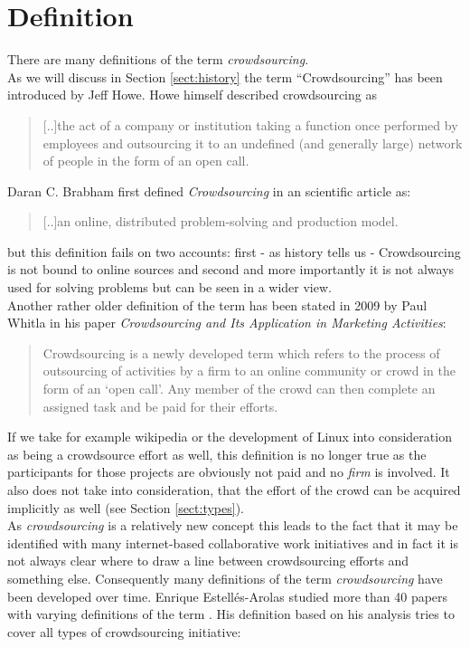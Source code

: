\documentclass{acm_proc_article-sp}
\begin{document}
\section{Definition}
There are many definitions of the term \textit{crowdsourcing}. \\
As we will discuss in Section \ref{sect:history} the term ``Crowdsourcing'' has been introduced by Jeff Howe\cite{howe:rise}. Howe himself described crowdsourcing as
\begin{quote}
[..]the act of a company or institution taking a function once performed by employees and outsourcing it to an undefined (and generally large) network of people in the form of an open call.
\end{quote}
Daran C. Brabham first defined \textit{Crowdsourcing} in an scientific article \cite{brabham:crowd1} as:
\begin{quote}
 [..]an online, distributed problem-solving and production model.
\end{quote}
but this definition fails on two accounts: first - as history tells us - Crowdsourcing is not bound to online sources and second and more importantly it is not always used for solving problems but can be seen in a wider view.\\
Another rather older definition of the term has been stated in 2009 by Paul Whitla in his paper \textit{Crowdsourcing and Its Application in Marketing Activities}\cite{whitla:crowd}:
\begin{quote}
Crowdsourcing is a newly developed term which refers to the process of outsourcing of activities by a firm to an online community or crowd in the form of an ‘open call’. Any member of the crowd can then complete an assigned task and be paid for their efforts. 
\end{quote}
If we take for example wikipedia or the development of Linux into consideration as being a crowdsource effort as well, this definition is no longer true as the participants for those projects are obviously not paid and no \textit{firm} is involved. It also does not take into consideration, that the effort of the crowd can be acquired implicitly as well (see Section \ref{sect:types}).\\
As \textit{crowdsourcing} is a relatively new concept this leads to the fact that it may be identified with many internet-based collaborative work initiatives and in fact it is not always clear where to draw a line between crowdsourcing efforts and something else. Consequently many definitions of the term \textit{crowdsourcing} have been developed over time. Enrique Estellés-Arolas studied more than 40 papers with varying definitions of the term \cite{arolas:definition}. His definition based on his analysis tries to cover all types of crowdsourcing initiative:
\end{document}
